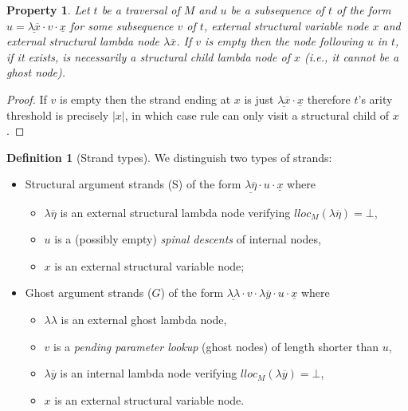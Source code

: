 \documentclass{elsarticle}
\makeatletter
\theoremstyle{plain}
\newtheorem{property}[theorem]{Property}
\theoremstyle{definition}
\newtheorem{definition}{Definition}[section]
\theoremstyle{remark}
\newcommand{\ghostlmd}{{\lambda\!\!\lambda}}
\renewcommand\ie{{\it i.e.\@\xspace}}
\makeatother
\begin{document}
\begin{property}
\label{prop:strand_spinaldescent}
Let $t$ be a traversal of $M$ and $u$ be a subsequence of $t$ of the form
$u = \underline{\lambda \overline{x}} \cdot v \cdot \underline{x}$
for some subsequence $v$ of $t$, external structural variable node $x$ and external structural lambda node $\lambda \overline{x}$.
If $v$ is empty then the node following $u$ in $t$, if it exists, is necessarily a structural child lambda node of $x$ (\ie, it cannot be a ghost node).
\end{property}
\begin{proof}
 If $v$ is empty then the strand ending at $x$
 is just $\underline{\lambda \overline{x}} \cdot \underline{x}$ therefore
 $t$'s arity threshold is precisely $|x|$, in which case rule  can only visit a structural child of $x$.
\end{proof}

\begin{definition}[Strand types]
    \label{def:strandtypes} We distinguish two types of strands:
    \begin{itemize}[nosep]
        \item Structural argument strands (S) of the form $\underline{\lambda\overline{\eta}} \cdot u \cdot \underline{x}$
            where
            \begin{itemize}[nosep]
            \item $\lambda\overline{\eta}$ is an external structural lambda node verifying $lloc_M(\lambda\overline\eta) = \bot$,
            \item $u$ is a (possibly empty) \emph{spinal descents} of internal nodes,
            \item $x$ is an external structural variable node;
            \end{itemize}

        \item Ghost argument strands ($G$) of the form $\underline{\ghostlmd} \cdot  v \cdot \lambda\overline{y} \cdot u \cdot \underline{x}$
        where
        \begin{itemize}[nosep]
            \item $\ghostlmd$ is an external ghost lambda node,
            \item $v$ is a \emph{pending parameter lookup} (ghost nodes) of length shorter than $u$,
            \item $\lambda\overline{y}$ is an internal lambda node verifying $lloc_M(\lambda\overline{y}) = \bot$,
            \item $x$ is an external structural variable node.
        \end{itemize}
    \end{itemize}
\end{definition}
\end{document}
